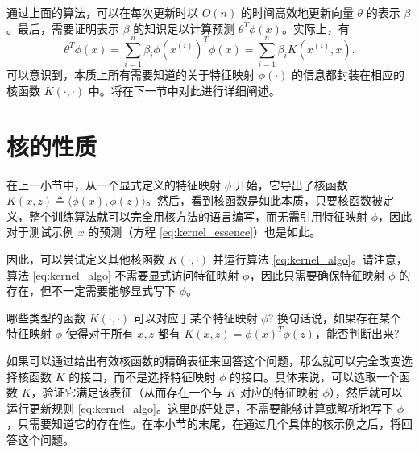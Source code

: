通过上面的算法，可以在每次更新时以 $O(n)$ 的时间高效地更新向量 $\theta$ 的表示 $\beta$。最后，需要证明表示 $\beta$ 的知识足以计算预测 $\theta^T \phi(x)$。实际上，有
\begin{equation}
    \theta^T \phi(x) = \sum_{i=1}^n \beta_i \phi(x^{(i)})^T \phi(x) = \sum_{i=1}^n \beta_i K(x^{(i)}, x).
    \label{eq:kernel_essence}
\end{equation}
可以意识到，本质上所有需要知道的关于特征映射 $\phi(\cdot)$ 的信息都封装在相应的核函数 $K(\cdot, \cdot)$ 中。将在下一节中对此进行详细阐述。

\section{核的性质}

在上一小节中，从一个显式定义的特征映射 $\phi$ 开始，它导出了核函数 $K(x, z) \triangleq \langle \phi(x), \phi(z) \rangle$。然后，看到核函数是如此本质，只要核函数被定义，整个训练算法就可以完全用核方法的语言编写，而无需引用特征映射 $\phi$，因此对于测试示例 $x$ 的预测（方程 \eqref{eq:kernel_essence}）也是如此。

因此，可以尝试定义其他核函数 $K(\cdot, \cdot)$ 并运行算法 \eqref{eq:kernel_algo}。请注意，算法 \eqref{eq:kernel_algo} 不需要显式访问特征映射 $\phi$，因此只需要确保特征映射 $\phi$ 的存在，但不一定需要能够显式写下 $\phi$。

哪些类型的函数 $K(\cdot, \cdot)$ 可以对应于某个特征映射 $\phi$? 换句话说，如果存在某个特征映射 $\phi$ 使得对于所有 $x, z$ 都有 $K(x, z) = \phi(x)^T \phi(z)$，能否判断出来?

如果可以通过给出有效核函数的精确表征来回答这个问题，那么就可以完全改变选择核函数 $K$ 的接口，而不是选择特征映射 $\phi$ 的接口。具体来说，可以选取一个函数 $K$，验证它满足该表征（从而存在一个与 $K$ 对应的特征映射 $\phi$），然后就可以运行更新规则 \eqref{eq:kernel_algo}。这里的好处是，不需要能够计算或解析地写下 $\phi$，只需要知道它的存在性。在本小节的末尾，在通过几个具体的核示例之后，将回答这个问题。

